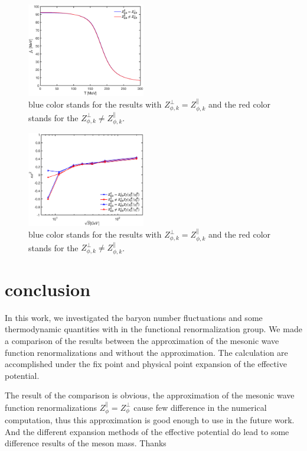 \documentclass[%
reprint,
superscriptaddress,
showpacs,preprintnumbers,
 amsmath,amssymb,
 aps,
prd,
]{revtex4-1}
\begin{document}
\begin{figure}[t]
\includegraphics[width=0.46\textwidth]{fpi.eps}
\caption{blue color stands for the results with $Z^{\bot}_{\phi,k}=Z^{\|}_{\phi,k}$ and the red color stands for the $Z^{\bot}
_{\phi,k}\neq Z^{\|}_{\phi,k} $.}
\label{fig:fpi}
\end{figure}

\begin{figure}[t]
\includegraphics[width=0.46\textwidth]{freeze.eps}
\caption{blue color stands for the results with $Z^{\bot}_{\phi,k}=Z^{\|}_{\phi,k}$ and the red color stands for the $Z^{\bot}
_{\phi,k}\neq Z^{\|}_{\phi,k} $.}
\label{fig:freeze}
\end{figure}


\section{conclusion}
In this work, we investigated the baryon number fluctuations and some thermodynamic quantities with in the functional 
renormalization group. We made a comparison of the results between the approximation of the mesonic wave function 
renormalizations and without the approximation. The calculation are accomplished under the fix point and physical point expansion of 
the effective potential. 


The result of the comparison is obvious, the approximation of the mesonic wave function renormalizations 
$Z^{\|}_{\phi}=Z^{\bot}_{\phi}$ cause few difference in the numerical computation, thus this approximation is good enough to use in 
the future work. And the different expansion methods of the effective potential do lead to some difference results of the meson mass.
\acknowledgments
Thanks
\end{document}
